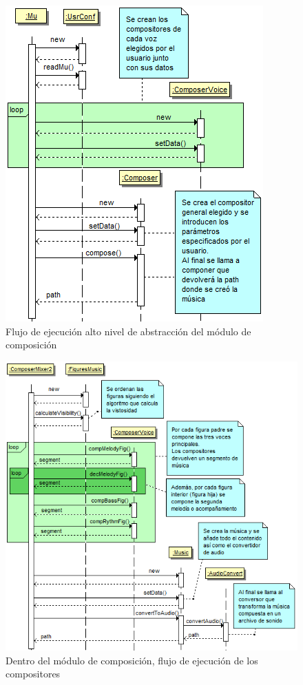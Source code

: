 		\begin{figure}[!htbp]
		\centering
		\includegraphics[scale=0.6]{graphics/diagramaflujoMU1.png}
		\caption{Flujo de ejecución alto nivel de abstracción del módulo de composición}
		\label{fig:diagramaflujoMU1}
		\end{figure}

		\begin{figure}[!htbp]
		\centering
		\includegraphics[scale=0.6]{graphics/diagramaflujoMU2.png}
		\caption{Dentro del módulo de composición, flujo de ejecución de los compositores}
		\label{fig:diagramaflujoMU2}
		\end{figure}




